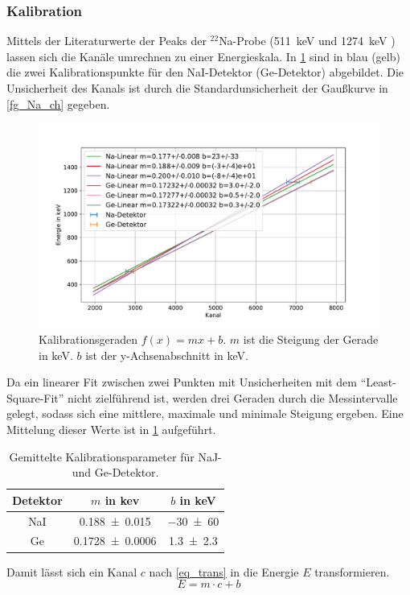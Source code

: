 \documentclass[
	a4paper,
	12pt,
	pagesize,
	ngerman
]{scrartcl}
\begin{document}
	\subsubsection{Kalibration}
  Mittels der Literaturwerte der Peaks der $^{22}$Na-Probe (\SI{511}{keV} und \SI{1274}{keV} \cite{Anleitung}) lassen sich die Kanäle umrechnen zu einer Energieskala.  %
	In \cref{fg_kali_mix} sind in blau (gelb) die zwei Kalibrationspunkte für den NaI-Detektor (Ge-Detektor) abgebildet.
	Die Unsicherheit des Kanals ist durch die Standardunsicherheit der Gaußkurve in \cref{fg_Na_ch} gegeben.

	\begin{figure}[H]
			\includegraphics[width= 0.8 \linewidth]{img/kali_mix.pdf}
			\caption{
				Kalibrationsgeraden $f(x)=mx+b$.
				$m$ ist die Steigung der Gerade in \si{keV}.
				$b$ ist der y-Achsenabschnitt in \si{keV}.
			}
			\label{fg_kali_mix}
	\end{figure}

	Da ein linearer Fit zwischen zwei Punkten mit Unsicherheiten mit dem \enquote{Least-Square-Fit} nicht zielführend ist, werden drei Geraden durch die Messintervalle gelegt, sodass sich eine mittlere, maximale und minimale Steigung ergeben. %
	Eine Mittelung dieser Werte ist in \cref{tb_kali_avg} aufgeführt.

\begin{table}[H]
		\centering
		\begin{tabular}{c | c | c  }
			 Detektor& $m$ in \si{kev}& $b$ in \si{keV} \\ \hline
			 NaI & \SI{0.188+-0.015}{} & \SI{-30+-60}{} \\
			 Ge & \SI{0.1728+-0.0006}{} & \SI{1.3+-2.3}{} \\
		\end{tabular}
		\caption{
		Gemittelte Kalibrationsparameter für NaJ- und Ge-Detektor.
		}
		\label{tb_kali_avg}
\end{table}
Damit lässt sich ein Kanal $c$ nach \cref{eq_trans} in die Energie $E$ transformieren.
\begin{equation}
	\label{eq_trans}
	E = m\cdot c + b
\end{equation}
\end{document}
